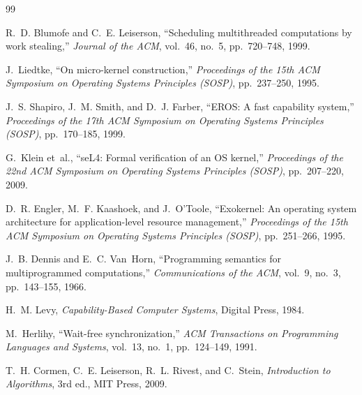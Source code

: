 \documentclass[11pt,twoside,openright]{book}
\theoremstyle{definition}
\theoremstyle{plain}
\theoremstyle{remark}
\begin{document}
\begin{thebibliography}{99}

R.~D. Blumofe and C.~E. Leiserson,
``Scheduling multithreaded computations by work stealing,''
\emph{Journal of the ACM}, vol.~46, no.~5, pp.~720--748, 1999.

J.~Liedtke,
``On micro-kernel construction,''
\emph{Proceedings of the 15th ACM Symposium on Operating Systems Principles (SOSP)},
pp.~237--250, 1995.

J.~S. Shapiro, J.~M. Smith, and D.~J. Farber,
``EROS: A fast capability system,''
\emph{Proceedings of the 17th ACM Symposium on Operating Systems Principles (SOSP)},
pp.~170--185, 1999.

G.~Klein et~al.,
``seL4: Formal verification of an OS kernel,''
\emph{Proceedings of the 22nd ACM Symposium on Operating Systems Principles (SOSP)},
pp.~207--220, 2009.

D.~R. Engler, M.~F. Kaashoek, and J.~O'Toole,
``Exokernel: An operating system architecture for application-level resource management,''
\emph{Proceedings of the 15th ACM Symposium on Operating Systems Principles (SOSP)},
pp.~251--266, 1995.

J.~B. Dennis and E.~C. Van~Horn,
``Programming semantics for multiprogrammed computations,''
\emph{Communications of the ACM}, vol.~9, no.~3, pp.~143--155, 1966.

H.~M. Levy,
\emph{Capability-Based Computer Systems},
Digital Press, 1984.

M.~Herlihy,
``Wait-free synchronization,''
\emph{ACM Transactions on Programming Languages and Systems}, vol.~13, no.~1,
pp.~124--149, 1991.

T.~H. Cormen, C.~E. Leiserson, R.~L. Rivest, and C.~Stein,
\emph{Introduction to Algorithms}, 3rd ed.,
MIT Press, 2009.

\end{thebibliography}
\end{document}
